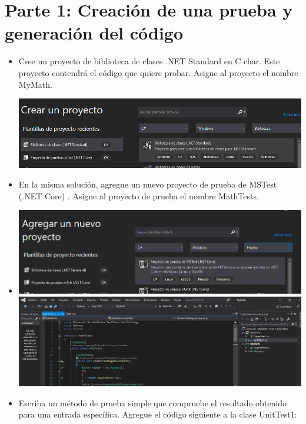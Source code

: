 \section{Parte 1: Creación de una prueba y generación del código} 
\begin{itemize}
 \item  Cree un proyecto de biblioteca de clases .NET Standard en C char. Este proyecto contendrá el código
que quiere probar. Asigne al proyecto el nombre MyMath.
\begin{center}
\includegraphics[width=\columnwidth]{images/1}\newline
\end{center}
 \item  En la misma solución, agregue un nuevo proyecto de prueba de MSTest (.NET Core) . Asigne al
proyecto de prueba el nombre MathTests.
 \item
\begin{center}
\includegraphics[width=\columnwidth]{images/2}\newline
\includegraphics[width=\columnwidth]{images/001}\newline
\end{center} 
 \item Escriba un método de prueba simple que compruebe el resultado obtenido para una entrada
específica. Agregue el código siguiente a la clase UnitTest1:

\end{itemize}
